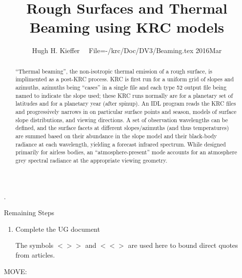 \documentclass{article}
\title{Rough Surfaces and Thermal Beaming using KRC models}
\author{Hugh H. Kieffer  \ \ File=-/krc/Doc/DV3/Beaming.tex  2016Mar}
\newcommand{\bq}{$ < \! > \!   \! >$ } %
\newcommand{\eq}{ $< \! \! < \! > $ } %
\begin{document}
\maketitle
\tableofcontents
\listoffigures
\hrulefill .\hrulefill

\begin{abstract}
``Thermal beaming'', the non-isotropic thermal emission of a rough surface, is
  implimented as a post-KRC process.  KRC is first run for a uniform grid of
  slopes and azimuths, azimuths being ``cases'' in a single file and each type
  52 output file being named to indicate the slope used; these KRC runs normally
  are for a planetary set of latitudes and for a planetary year (after
  spinup). An IDL program reads the KRC files and progressively narrows in on
  particular surface points and season, models of surface slope distributions,
  and viewing directions. A set of observation wavelengths can be defined, and
  the surface facets at different slopes/azimuths (and thus temperatures) are
  summed based on their abundance in the slope model and their black-body
  radiance at each wavelength, yielding a forecast infrared spectrum. While
  designed primarily for airless bodies, an ``atmosphere-present'' mode accounts
  for an atmosphere grey spectral radiance at the appropriate viewing geometry.
\end{abstract}

Remaining Steps \begin{enumerate}    %
 \item Complete the UG document

The symbols \bq and \eq  are used here to bound direct quotes from articles.

\end{enumerate}

\hrulefill MOVE: \hrulefill
\end{document}
